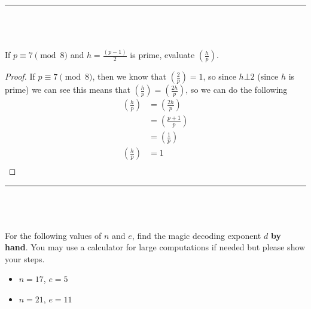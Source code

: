 \documentclass[11pt]{article}
\newcommand\leg[2]{\left(\frac{#1}{#2}\right)}
\newenvironment{myproblem}[1][Problem]{\begin{trivlist}
    \item[\hskip \labelsep {\bfseries #1.}]}{\end{trivlist}}
\begin{document}
\hrule
~\newline

\section{}

\begin{myproblem}
  If $p\equiv 7\pmod{8}$ and $h=\frac{(p-1)}{2}$ is prime, evaluate $\leg{h}{p}$.
\end{myproblem}

\begin{proof}
  If $p\equiv 7\pmod{8}$, then we know that $\leg{2}{p}=1$, so since $h\bot 2$ (since $h$ is prime) we can see this means that $\leg{h}{p}=\leg{2h}{p}$, so we can do the following
  \begin{align*}
    \leg{h}{p} & = \leg{2h}{p}  \\
               & = \leg{p+1}{p} \\
               & = \leg{1}{p}   \\
    \leg{h}{p} & = 1            \\
  \end{align*}
\end{proof}


\hrule
~\newline

\section{}

\begin{myproblem}
  For the following values of $n$ and $e$, find the magic decoding exponent $d$ \textbf{by hand}. You may use a calculator for large computations if needed but please show your steps.
  \begin{itemize}
    \item[(a)] $n=17$, $e=5$
    \item[(b)] $n=21$, $e=11$
  \end{itemize}
\end{myproblem}
\end{document}
